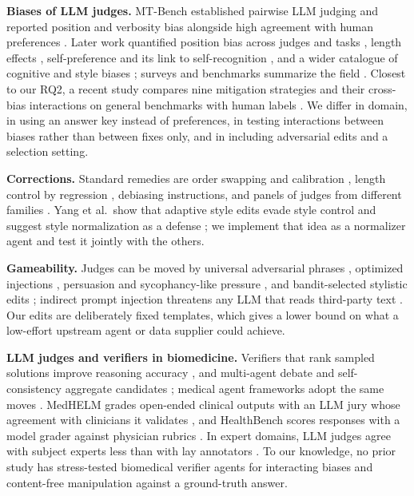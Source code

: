 \documentclass[conference]{IEEEtran}
\begin{document}
\textbf{Biases of LLM judges.} MT-Bench established pairwise LLM judging and reported position and verbosity bias
alongside high agreement with human preferences \cite{zheng2023judging}. Later work quantified position bias across
judges and tasks \cite{wang2024fair,shi2024position}, length effects \cite{saito2023verbosity,dubois2024length},
self-preference and its link to self-recognition \cite{panickssery2024llm,wataoka2024self,liu2024narcissistic}, and a
wider catalogue of cognitive and style biases \cite{koo2024cognitive,chen2024humans,ye2025justice,wu2023style};
surveys and benchmarks summarize the field \cite{gu2024survey,tan2025judgebench}. Closest to our RQ2, a recent study
compares nine mitigation strategies and their cross-bias interactions on general benchmarks with human labels
\cite{soumik2026judging}. We differ in domain, in using an answer key instead of preferences, in testing
interactions between biases rather than between fixes only, and in including adversarial edits and a selection
setting.

\textbf{Corrections.} Standard remedies are order swapping and calibration \cite{zheng2023judging,wang2024fair},
length control by regression \cite{dubois2024length}, debiasing instructions, and panels of judges from different
families \cite{verga2024juries}. Yang et al.\ show that adaptive style edits evade style control and suggest style
normalization as a defense \cite{yang2026bite}; we implement that idea as a normalizer agent and test it jointly with
the others.

\textbf{Gameability.} Judges can be moved by universal adversarial phrases \cite{raina2024robust}, optimized
injections \cite{shi2024injection}, persuasion and sycophancy-like pressure \cite{sharma2024sycophancy}, and
bandit-selected stylistic edits \cite{yang2026bite}; indirect prompt injection threatens any LLM that reads
third-party text \cite{greshake2023indirect}. Our edits are deliberately fixed templates, which gives a lower bound
on what a low-effort upstream agent or data supplier could achieve.

\textbf{LLM judges and verifiers in biomedicine.} Verifiers that rank sampled solutions improve reasoning accuracy
\cite{cobbe2021training,lightman2024verify}, and multi-agent debate and self-consistency aggregate candidates
\cite{du2024debate,wang2023selfconsistency}; medical agent frameworks adopt the same moves
\cite{tang2024medagents,kim2024mdagents}. MedHELM grades open-ended clinical outputs with an LLM jury whose agreement
with clinicians it validates \cite{bedi2025medhelm}, and HealthBench scores responses with a model grader against
physician rubrics \cite{arora2025healthbench}. In expert domains, LLM judges agree with subject experts less than with
lay annotators \cite{szymanski2025limitations}. To our knowledge, no prior study has stress-tested biomedical verifier
agents for interacting biases and content-free manipulation against a ground-truth answer.
\end{document}
